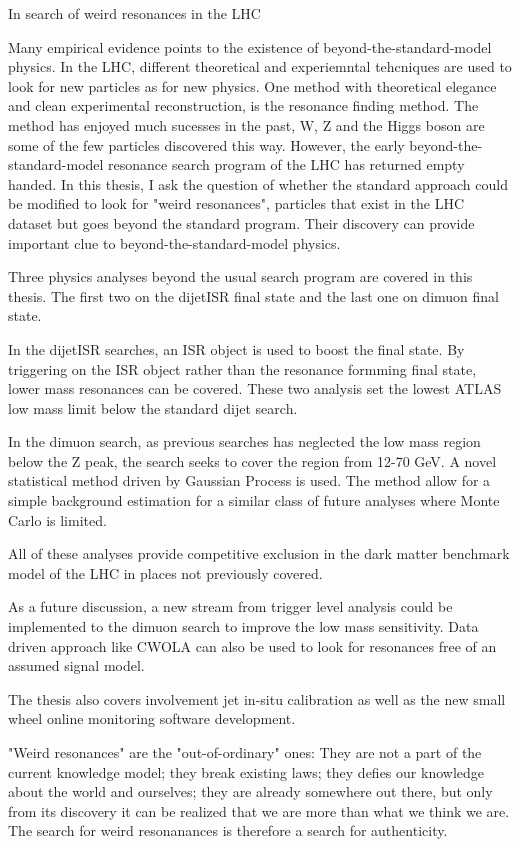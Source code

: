 In search of weird resonances in the LHC

Many empirical evidence points to the existence of beyond-the-standard-model physics. In the LHC, different theoretical and experiemntal tehcniques are used to look for new particles as for new physics. One method with theoretical elegance and clean experimental reconstruction, is the resonance finding method. The method has enjoyed much sucesses in the past, W, Z and the Higgs boson are some of the few particles discovered this way. However, the early beyond-the-standard-model resonance search program of the LHC has returned empty handed. 
In this thesis, I ask the question of whether the standard approach could be modified to look for "weird resonances", particles that exist in the LHC dataset but goes beyond the standard program. Their discovery can provide important clue to beyond-the-standard-model physics. 

Three physics analyses beyond the usual search program are covered in this thesis. The first two on the dijetISR final state and the last one on dimuon final state. 

In the dijetISR searches, an ISR object is used to boost the final state. By triggering on the ISR object rather than the resonance formming final state, lower mass resonances can be covered. These two analysis set the lowest ATLAS low mass limit below the standard dijet search.

In the dimuon search, as previous searches has neglected the low mass region below the Z peak, the search seeks to cover the region from 12-70 GeV. A novel statistical method driven by Gaussian Process is used. The method allow for a simple background estimation for a similar class of future analyses where Monte Carlo is limited.

All of these analyses provide competitive exclusion in the dark matter benchmark model of the LHC in places not previously covered.

As a future discussion, a new stream from trigger level analysis could be implemented to the dimuon search to improve the low mass sensitivity. Data driven approach like CWOLA can also be used to look for resonances free of an assumed signal model.

The thesis also covers involvement jet in-situ calibration as well as the new small wheel online monitoring software development.

"Weird resonances" are the "out-of-ordinary" ones: They are not a part of the current knowledge model; they break existing laws; they defies our knowledge about the world and ourselves; they are already somewhere out there, but only from its discovery it can be realized that we are more than what we think we are. The search for weird resonanances is therefore a search for authenticity.
